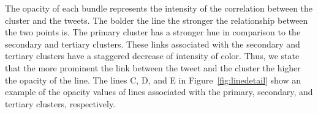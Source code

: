 The opacity of each bundle represents the intensity of the correlation between the cluster and the tweets. The bolder the line the stronger the relationship between the two points is. The primary cluster has a stronger hue in comparison to the secondary and tertiary clusters. These links associated with the secondary and tertiary clusters have a staggered decrease of intensity of color. Thus, we state that the more prominent the link between the tweet and the cluster the higher the opacity of the line. The lines C, D, and E in Figure~\ref{fig:linedetail} show an example of the opacity values of lines associated with the primary, secondary, and tertiary clusters, respectively. 


